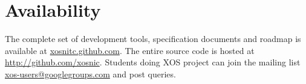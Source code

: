 \documentclass{sig-alternate}
\begin{document}
\section{Availability}
The complete set of development tools, specification documents and roadmap is available at \url{xosnitc.github.com}. The entire source code is hosted at \url{http://github.com/xosnic}. Students doing XOS project can join the mailing list \url{xos-users@googlegroups.com} and post queries.




%
%
\end{document}
